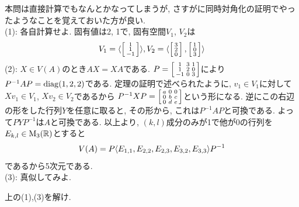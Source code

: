 \begin{egans} 本問は直接計算でもなんとかなってしまうが, さすがに同時対角化の証明でやったようなことを覚えておいた方が良い. \\
(1): 各自計算せよ. 固有値は2, 1で, 固有空間$V_1$, $V_2$は
\[V_1 = \langle \left[\begin{smallmatrix}1\\1 \\ -1\end{smallmatrix}\right] \rangle,  V_2 = \langle \left[\begin{smallmatrix}3\\ 2 \\ 0\end{smallmatrix}\right], \left[\begin{smallmatrix}1 \\ 0 \\ 3\end{smallmatrix}\right] \rangle \]
(2): $X\in V(A)$のとき$AX=XA$である. $P = \left[\begin{smallmatrix}1 & 3 & 1\\ 1 & 2 & 0 \\ -1 & 0 & 3\end{smallmatrix}\right]$により$P^{-1}AP = \mathrm{diag}(1,2,2)$である. 定理の証明で述べられたように, $v_1\in V_1$に対して$Xv_1\in V_1$, $Xv_2\in V_2$であるから $P^{-1}XP = \left[\begin{smallmatrix}a&0&0\\ 0&b&c\\ 0&d&e\end{smallmatrix}\right]$という形になる. 逆にこの右辺の形をした行列$Y$を任意に取ると, その形から, これは$P^{-1}AP$と可換である. よって$PYP^{-1}$は$A$と可換である. 以上より,  $(k,l)$成分のみが1で他が0の行列を$E_{k,l}\in \mathrm{M}_{3}(\mathbb{R})$とすると
\[V(A) = P\langle E_{1,1}, E_{2,2}, E_{2,3}, E_{3,2}, E_{3,3} \rangle P^{-1}\]
であるから5次元である. \\
(3): 真似してみよ.
\end{egans}
\begin{prac}
上の(1),(3)を解け.
\end{prac}

